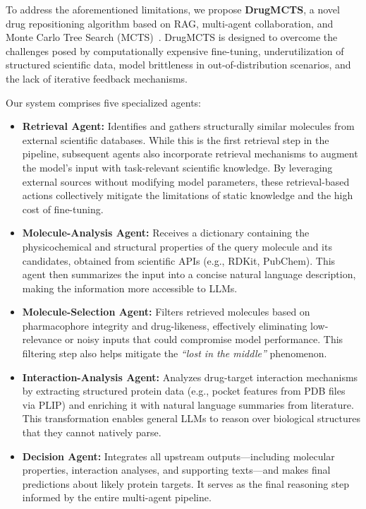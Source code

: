\documentclass[letterpaper,twocolumn,10pt]{llncs}
\begin{document}
To address the aforementioned limitations, we propose \textbf{DrugMCTS}, a novel drug repositioning algorithm based on RAG, multi-agent collaboration, and Monte Carlo Tree Search (MCTS)~\cite{chaslot2010monte}. DrugMCTS is designed to overcome the challenges posed by computationally expensive fine-tuning, underutilization of structured scientific data, model brittleness in out-of-distribution scenarios, and the lack of iterative feedback mechanisms.

Our system comprises five specialized agents:

\begin{itemize}
    \item \textbf{Retrieval Agent:} Identifies and gathers structurally similar molecules from external scientific databases. While this is the first retrieval step in the pipeline, subsequent agents also incorporate retrieval mechanisms to augment the model’s input with task-relevant scientific knowledge. By leveraging external sources without modifying model parameters, these retrieval-based actions collectively mitigate the limitations of static knowledge and the high cost of fine-tuning.

    
    \item \textbf{Molecule-Analysis Agent:} Receives a dictionary containing the physicochemical and structural properties of the query molecule and its candidates, obtained from scientific APIs (e.g., RDKit, PubChem). This agent then summarizes the input into a concise natural language description, making the information more accessible to LLMs. 
    
    \item \textbf{Molecule-Selection Agent:} Filters retrieved molecules based on pharmacophore integrity and drug-likeness, effectively eliminating low-relevance or noisy inputs that could compromise model performance. This filtering step also helps mitigate the \textit{“lost in the middle”} phenomenon.

    \item \textbf{Interaction-Analysis Agent:} Analyzes drug-target interaction mechanisms by extracting structured protein data (e.g., pocket features from PDB files via PLIP) and enriching it with natural language summaries from literature. This transformation enables general LLMs to reason over biological structures that they cannot natively parse.
    
    \item \textbf{Decision Agent:} Integrates all upstream outputs—including molecular properties, interaction analyses, and supporting texts—and makes final predictions about likely protein targets. It serves as the final reasoning step informed by the entire multi-agent pipeline.
\end{itemize}
\end{document}
